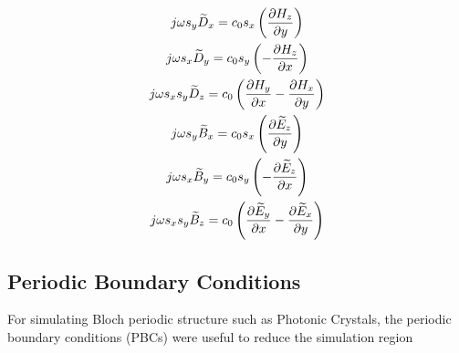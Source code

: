 \begin{gather}
  j\omega s_y \widetilde{D}_x = c_0 s_x \curlHxTwo\\
  j\omega s_x \widetilde{D}_y = c_0 s_y \curlHyTwo\\
  j\omega s_x s_y \widetilde{D}_z = c_0 \curlHzTwo\\
  j\omega s_y \widetilde{B}_x = c_0 s_x \curlExTwo\\
  j\omega s_x \widetilde{B}_y = c_0 s_y \curlEyTwo\\
  j\omega s_x s_y \widetilde{B}_z = c_0 \curlEzTwo
\end{gather}




\subsection{Periodic Boundary Conditions}

For simulating Bloch periodic structure such as Photonic Crystals, the periodic boundary conditions (PBCs) were useful
to reduce the simulation region
